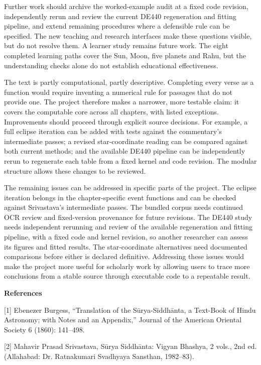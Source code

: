 \documentclass[
]{article}
\begin{document}
Further work should archive the worked-example audit at a fixed code
revision, independently rerun and review the current DE440 regeneration
and fitting pipeline, and extend remaining procedures where a defensible
rule can be specified. The new teaching and research interfaces make
these questions visible, but do not resolve them. A learner study
remains future work. The eight completed learning paths cover the Sun,
Moon, five planets and Rahu, but the understanding checks alone do not
establish educational effectiveness.

The text is partly computational, partly descriptive. Completing every
verse as a function would require inventing a numerical rule for
passages that do not provide one. The project therefore makes a
narrower, more testable claim: it covers the computable core across all
chapters, with listed exceptions. Improvements should proceed through
explicit source decisions. For example, a full eclipse iteration can be
added with tests against the commentary's intermediate passes; a revised
star-coordinate reading can be compared against both current methods;
and the available DE440 pipeline can be independently rerun to
regenerate each table from a fixed kernel and code revision. The modular
structure allows these changes to be reviewed.

The remaining issues can be addressed in specific parts of the project.
The eclipse iteration belongs in the chapter-specific event functions
and can be checked against Srivastava's intermediate passes. The bundled
corpus needs continued OCR review and fixed-version provenance for
future revisions. The DE440 study needs independent rerunning and review
of the available regeneration and fitting pipeline, with a fixed code
and kernel revision, so another researcher can assess its figures and
fitted results. The star-coordinate alternatives need documented
comparisons before either is declared definitive. Addressing these
issues would make the project more useful for scholarly work by allowing
users to trace more conclusions from a stable source through executable
code to a repeatable result.

\textbf{References}

{[}1{]} Ebenezer Burgess, ``Translation of the Sūrya-Siddhānta, a
Text-Book of Hindu Astronomy; with Notes and an Appendix,'' Journal of
the American Oriental Society 6 (1860): 141--498.

{[}2{]} Mahavir Prasad Srivastava, Sūrya Siddhānta: Vigyan Bhashya, 2
vols., 2nd ed. (Allahabad: Dr. Ratnakumari Svadhyaya Sansthan,
1982--83).
\end{document}
